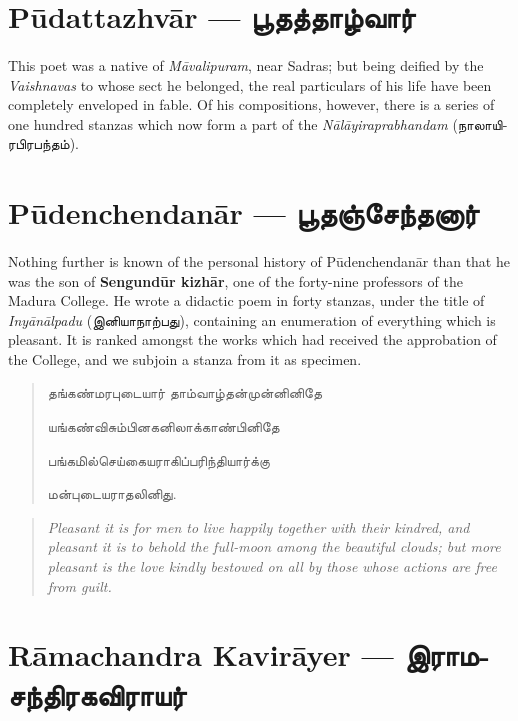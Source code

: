 \documentclass{article}
\newcommand{\TamilText}[1]{\texttamil{#1}}
\newcommand{\TamilBold}[1]{\texttamil{\textbf{#1}}}
\newcommand{\tam}[1]{\TamilText{#1}}
\newcommand{\tambold}[1]{\TamilBold{#1}}
\begin{document}
\section{P\={u}dattazhv\={a}r --- \tambold{பூதத்தாழ்வார்}}
\paragraph{}
This poet was a native of \emph{M\={a}valipuram}, near Sadras; but being deified by the \emph{Vaishnavas} to whose sect he belonged, the real particulars of his life have been completely enveloped in fable. Of his compositions, however, there is a series of one hundred stanzas which now form a part of the \emph{N\={a}l\={a}yiraprabhandam} (\tam{நாலாயிரபிரபந்தம்}).

\section{P\={u}denchendan\={a}r --- \tambold{பூதஞ்சேந்தனார்}}
\paragraph{}
Nothing further is known of the personal history of P\={u}denchendan\={a}r than that he was the son of \textbf{Sengund\={u}r kizh\={a}r}, one of the forty-nine professors of the Madura College. He wrote a didactic poem in forty stanzas, under the title of \emph{Iny\={a}n\={a}lpadu} (\tam{இனியாநாற்பது}), containing an enumeration of everything which is pleasant. It is ranked amongst the works which had received the approbation of the College, and we subjoin a stanza from it as specimen.
\begin{quotation}\small
\tam{தங்கண்மரபுடையார்‌ தாம்வாழ்தன்‌முன்னினிதே}

\tam{யங்கண்விசும்பினகனிலாக்காண்பினிதே}

\tam{பங்கமில்செய்கையராகிப்பரிந்தியார்க்கு}

\tam{மன்புடையராதலினிது}.
\end{quotation}
\begin{quotation}\small
\emph{Pleasant it is for men to live happily together with their kindred, and pleasant it is to behold the full-moon among the beautiful clouds; but more pleasant is the love kindly bestowed on all by those whose actions are free from guilt.}
\end{quotation}

\section{R\={a}machandra Kavir\={a}yer --- \tambold{இராமசந்திரகவிராயர்}}
\end{document}
